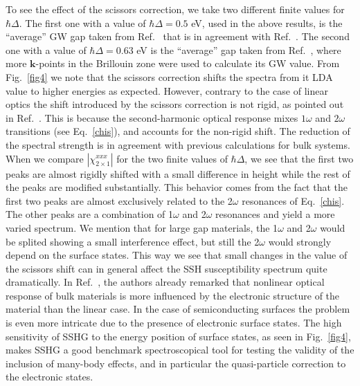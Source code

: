 \documentclass[floatfix,prb,aps,superscriptaddress,showpacs,11pt,preprint,letterpaper]{revtex4}
\def\chon{red}
\begin{document}
To see the effect of the scissors correction, we take two different
finite values for $\hbar\Delta$. The first one
with a value of $\hbar\Delta=0.5$ eV, used in the above results, 
is the ``average'' GW gap taken from 
Ref.~ 
that is in agreement with Ref.~. The second one
with a value of $\hbar\Delta=0.63$ eV is the ``average'' 
gap taken from Ref.~, 
where more $\mathbf{k}$-points in the Brillouin zone were 
used to calculate its GW value.
From Fig.~\ref{fig4}
we note that the scissors correction 
shifts the spectra from it LDA value to higher energies as expected.
 However, contrary 
to the case of linear optics\cite{cabellosPRB09} the shift introduced 
by the scissors correction is not 
rigid, as pointed out in Ref.~. 
 This is because the second-harmonic optical response mixes 
$1\omega$ and $2\omega$ transitions (see Eq.~\eqref{chis}), and accounts 
for the non-rigid shift. {\color{\chon}The reduction of the spectral strength is in 
agreement with previous calculations for bulk systems.
\cite{nastosPRB05, luppiPRB10, leitsmannPRB05}}
When we compare 
$|\chi^{xxx}_{2\times 1}|$ for the two finite values of $\hbar\Delta$,
we see that the first two peaks are almost rigidly 
shifted with a small difference in height while
the rest of the peaks are modified substantially. 
This behavior comes from the fact that the first two
peaks are almost exclusively related to the 
2$\omega$ resonances of
Eq.~\eqref{chis}. The other peaks are a combination 
of 1$\omega$ and 2$\omega$ resonances 
and yield a more varied spectrum.
We mention that for large gap materials, the 1$\omega$ and 2$\omega$ would be splited
showing a small interference effect, but still the 2$\omega$ would
strongly depend on the surface states.
 This way we see that small changes in the value of the 
scissors shift can in general affect the SSH susceptibility 
spectrum quite dramatically.
In Ref.~, the authors already remarked
that nonlinear optical response of bulk materials
is more influenced by the electronic structure
of the material than the linear case. 
In the case of semiconducting surfaces the
problem is even more intricate due to the presence of electronic
surface states.
The high sensitivity of SSHG to the energy position  of surface
states, as seen in Fig.~\ref{fig4}, makes SSHG a good benchmark
spectroscopical tool for testing the validity of the inclusion of many-body effects,
and in particular the quasi-particle correction to the electronic states. 
\end{document}
